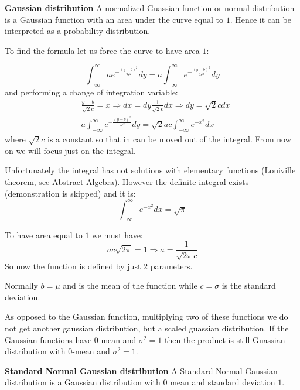 \begin{definition}{\textbf{Gaussian distribution}}
A normalized Guassian function or normal distribution is a Gaussian function with an area under the curve equal to $1$. Hence it can be interpreted as a probability distribution.

To find the formula let us force the curve to have area $1$:

\begin{equation}
\int_{-\infty}^{\infty} a e^{-\frac{(y-b)^2}{2c^2}} dy = a \int_{-\infty}^{\infty} e^{-\frac{(y-b)^2}{2c^2}} dy
\end{equation}
and performing a change of integration variable:
\begin{equation}
\begin{aligned}
&\frac{y-b}{\sqrt{2}c} = x \Rightarrow dx = dy \frac{1}{\sqrt{2}c} dx \Rightarrow dy = \sqrt{2}c dx\\
&a \int_{-\infty}^{\infty} e^{-\frac{(y-b)^2}{2c^2}} dy = \sqrt{2}ac  \int_{-\infty}^{\infty} e^{-x^2} dx 
\end{aligned}
\end{equation}
where  $ \sqrt{2}c$ is a constant so that in can be moved out of the integral. From now on we will focus just on the integral.

Unfortunately the integral has not solutions with elementary functions (Louiville theorem, see Abstract Algebra). However the definite integral exists (demonstration is skipped) and it is:
\begin{equation}
\int_{-\infty}^{\infty} e^{-x^2} dx = \sqrt{\pi}
\end{equation}

To have area equal to $1$ we must have:
\begin{equation}
ac\sqrt{2\pi} = 1 \Rightarrow a =  \frac{1}{\sqrt{2\pi}c}
\end{equation}
So now the function is defined by just 2 parameters. 

Normally $b=\mu$ and is the mean of the function while $c=\sigma$ is the standard deviation.

As opposed to the Gaussian function, multiplying two of these functions we do not get another gaussian distribution, but a scaled guassian distribution. If the Gaussian functions have 0-mean and $\sigma^2=1$ then the product is still Guassian distribution with $0$-mean and $\sigma^2=1$.
\end{definition}

\begin{definition}{\textbf{Standard Normal Gaussian distribution}}
A Standard Normal Gaussian distribution is a Gaussian distribution with $0$ mean and standard deviation $1$.
\end{definition}

